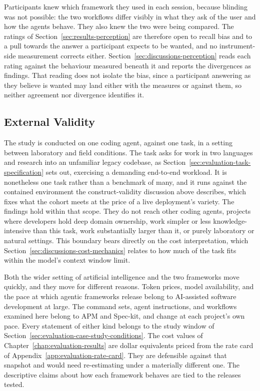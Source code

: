 Participants knew which framework they used in each session, because blinding was not possible: the two workflows differ visibly in what they ask of the user and how the agents behave. They also knew the two were being compared. The ratings of Section~\ref{sec:results-perception} are therefore open to recall bias and to a pull towards the answer a participant expects to be wanted, and no instrument-side measurement corrects either. Section~\ref{sec:discussions-perception} reads each rating against the behaviour measured beneath it and reports the divergences as findings. That reading does not isolate the bias, since a participant answering as they believe is wanted may land either with the measures or against them, so neither agreement nor divergence identifies it.

\subsection{External Validity}

The study is conducted on one coding agent, against one task, in a setting between laboratory and field conditions. The task asks for work in two languages and research into an unfamiliar legacy codebase, as Section~\ref{sec:evaluation-task-specification} sets out, exercising a demanding end-to-end workload. It is nonetheless one task rather than a benchmark of many, and it runs against the contained environment the construct-validity discussion above describes, which fixes what the cohort meets at the price of a live deployment's variety. The findings hold within that scope. They do not reach other coding agents, projects where developers hold deep domain ownership, work simpler or less knowledge-intensive than this task, work substantially larger than it, or purely laboratory or natural settings. This boundary bears directly on the cost interpretation, which Section~\ref{sec:discussions-cost-mechanics} relates to how much of the task fits within the model's context window limit.

Both the wider setting of artificial intelligence and the two frameworks move quickly, and they move for different reasons. Token prices, model availability, and the pace at which agentic frameworks release belong to AI-assisted software development at large. The command sets, agent instructions, and workflows examined here belong to APM and Spec-kit, and change at each project's own pace. Every statement of either kind belongs to the study window of Section~\ref{sec:evaluation-case-study-conditions}. The cost values of Chapter~\ref{chap:evaluation-results} are dollar equivalents priced from the rate card of Appendix~\ref{app:evaluation-rate-card}. They are defensible against that snapshot and would need re-estimating under a materially different one. The descriptive claims about how each framework behaves are tied to the releases tested.

